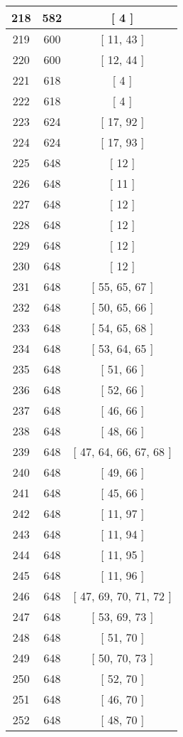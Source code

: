 \begin{center}
\begin{longtable}[H]{|| c c c ||}
\hline
218 & 582 & [ 4 ] \\ 
\hline
219 & 600 & [ 11, 43 ] \\ 
\hline
220 & 600 & [ 12, 44 ] \\ 
\hline
221 & 618 & [ 4 ] \\ 
\hline
222 & 618 & [ 4 ] \\ 
\hline
223 & 624 & [ 17, 92 ] \\ 
\hline
224 & 624 & [ 17, 93 ] \\ 
\hline
225 & 648 & [ 12 ] \\ 
\hline
226 & 648 & [ 11 ] \\ 
\hline
227 & 648 & [ 12 ] \\ 
\hline
228 & 648 & [ 12 ] \\ 
\hline
229 & 648 & [ 12 ] \\ 
\hline
230 & 648 & [ 12 ] \\ 
\hline
231 & 648 & [ 55, 65, 67 ] \\ 
\hline
232 & 648 & [ 50, 65, 66 ] \\ 
\hline
233 & 648 & [ 54, 65, 68 ] \\ 
\hline
234 & 648 & [ 53, 64, 65 ] \\ 
\hline
235 & 648 & [ 51, 66 ] \\ 
\hline
236 & 648 & [ 52, 66 ] \\ 
\hline
237 & 648 & [ 46, 66 ] \\ 
\hline
238 & 648 & [ 48, 66 ] \\ 
\hline
239 & 648 & [ 47, 64, 66, 67, 68 ] \\ 
\hline
240 & 648 & [ 49, 66 ] \\ 
\hline
241 & 648 & [ 45, 66 ] \\ 
\hline
242 & 648 & [ 11, 97 ] \\ 
\hline
243 & 648 & [ 11, 94 ] \\ 
\hline
244 & 648 & [ 11, 95 ] \\ 
\hline
245 & 648 & [ 11, 96 ] \\ 
\hline
246 & 648 & [ 47, 69, 70, 71, 72 ] \\ 
\hline
247 & 648 & [ 53, 69, 73 ] \\ 
\hline
248 & 648 & [ 51, 70 ] \\ 
\hline
249 & 648 & [ 50, 70, 73 ] \\ 
\hline
250 & 648 & [ 52, 70 ] \\ 
\hline
251 & 648 & [ 46, 70 ] \\ 
\hline
252 & 648 & [ 48, 70 ] \\ 
\hline

\end{longtable}
\end{center}

